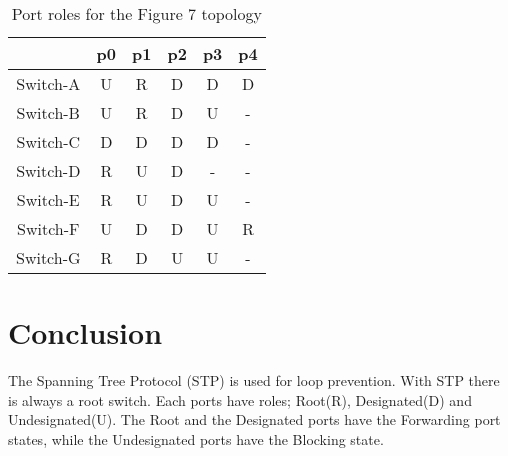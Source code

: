 \documentclass{article}
\begin{document}
\begin{table}[!h]
      \centering
    \begin{tabular}{|c|c|c|c|c|c|}
    \hline
         & p0 & p1 & p2 & p3 & p4 \\
    \hline
    Switch-A & U & R & D & D & D \\
    Switch-B & U & R & D & U & - \\
    Switch-C & D & D & D & D & - \\
    Switch-D & R & U & D & - & - \\
    Switch-E & R & U & D & U & - \\
    Switch-F & U & D & D & U & R \\
    Switch-G & R & D & U & U & - \\
    \hline
    \end{tabular}
    \caption{Port roles for the Figure 7 topology}
    \label{tab:fig7ports}
\end{table}

\part*{Conclusion}
The Spanning Tree Protocol (STP) is used for loop prevention. With STP there is always a root switch. Each ports have roles; Root(R), Designated(D) and Undesignated(U). The Root and the Designated ports have the Forwarding port states, while the Undesignated ports have the Blocking state.  
\end{document}
